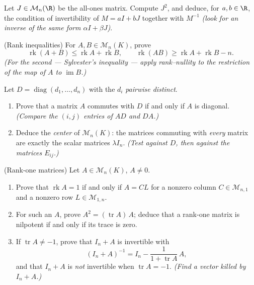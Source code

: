 \begin{exercise}[$\star\star\star$]\label{exo:b1:matrices:9}
Let $J \in \mathcal{M}_n(\R)$ be the all-ones matrix. Compute $J^2$,
and deduce, for $a, b \in \R$, the condition of invertibility of $M
= aI + bJ$ together with $M^{-1}$ \emph{(look for an inverse of the
same form $\alpha I + \beta J$)}.
\end{exercise}

\begin{exercise}[$\star\star\star$]\label{exo:b1:matrices:10}
(Rank inequalities) For $A, B \in \mathcal{M}_n(K)$, prove
\[
\operatorname{rk}(A + B) \leq \operatorname{rk} A +
\operatorname{rk} B,
\qquad
\operatorname{rk}(AB) \geq \operatorname{rk} A + \operatorname{rk}
B - n .
\]
\emph{(For the second --- Sylvester's inequality --- apply
rank--nullity to the restriction of the map of $A$ to
$\operatorname{im} B$.)}
\end{exercise}

\begin{exercise}[$\star\star$]\label{exo:b1:matrices:11}
Let $D = \operatorname{diag}(d_1, \dots, d_n)$ with the $d_i$
\emph{pairwise distinct}.
\begin{enumerate}
  \item Prove that a matrix $A$ commutes with $D$ if and only if
        $A$ is diagonal. \emph{(Compare the $(i,j)$ entries of
        $AD$ and $DA$.)}
  \item Deduce the \emph{center} of $\mathcal{M}_n(K)$: the
        matrices commuting with \emph{every} matrix are exactly
        the scalar matrices $\lambda I_n$. \emph{(Test against
        $D$, then against the matrices $E_{ij}$.)}
\end{enumerate}
\end{exercise}

\begin{exercise}[$\star\star\star$]\label{exo:b1:matrices:12}
(Rank-one matrices) Let $A \in \mathcal{M}_n(K)$, $A \neq 0$.
\begin{enumerate}
  \item Prove that $\operatorname{rk} A = 1$ if and only if $A =
        CL$ for a nonzero column $C \in \mathcal{M}_{n,1}$ and a
        nonzero row $L \in \mathcal{M}_{1,n}$.
  \item For such an $A$, prove $A^2 = (\operatorname{tr} A)\,A$;
        deduce that a rank-one matrix is nilpotent if and only if
        its trace is zero.
  \item If $\operatorname{tr} A \neq -1$, prove that $I_n + A$ is
        invertible with
        \[
        (I_n + A)^{-1} = I_n - \frac{1}{1 + \operatorname{tr}
        A}\,A ,
        \]
        and that $I_n + A$ is \emph{not} invertible when
        $\operatorname{tr} A = -1$. \emph{(Find a vector killed
        by $I_n + A$.)}
\end{enumerate}
\end{exercise}

